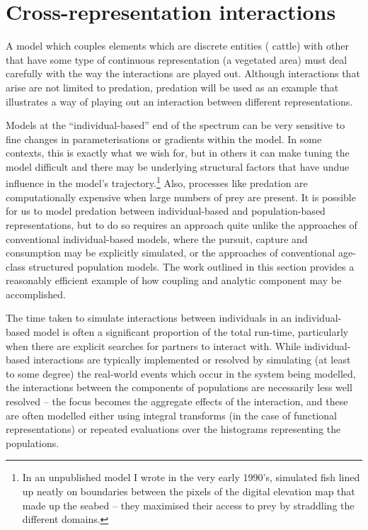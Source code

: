 \section{Cross-representation interactions\label{predation5}}

A model which couples elements which are discrete entities (\eg
cattle) with other that have some type of continuous representation
(\eg a vegetated area) must deal carefully with the way the
interactions are played out. Although interactions that arise are not
limited to predation, predation will be used as an example that
illustrates a way of playing out an interaction between different
representations. 

Models at the ``individual-based'' end of the spectrum can be very
sensitive to fine changes in parameterisations or gradients within the
model.  In some contexts, this is exactly what we wish for, but in
others it can make tuning the model difficult and there may be
underlying structural factors that have undue influence in the model's
trajectory.\footnote{In an unpublished model I wrote in the very early
1990's, simulated fish lined up neatly on boundaries between the
pixels of the digital elevation map that made up the seabed -- they
maximised their access to prey by straddling the different domains.}
Also, processes like predation are computationally expensive when
large numbers of prey are present.  It is possible for us to model
predation between individual-based and population-based
representations, but to do so requires an approach quite unlike the
approaches of conventional individual-based models, where the pursuit,
capture and consumption may be explicitly simulated, or the approaches
of conventional age-class structured population models.  The work
outlined in this section provides a reasonably efficient example of
how coupling and analytic component may be accomplished.

The time taken to simulate interactions between individuals in an
individual-based model is often a significant proportion of the total
run-time, particularly when there are explicit searches for partners
to interact with.  While individual-based interactions are typically
implemented or resolved by simulating (at least to some degree) the
real-world events which occur in the system being modelled, the
interactions between the components of populations are necessarily
less well resolved -- the focus becomes the aggregate effects of the
interaction, and these are often modelled either using integral
transforms (in the case of functional representations) or repeated
evaluations over the histograms representing the populations.

